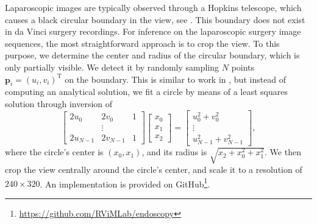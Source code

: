 Laparoscopic images are typically observed through a Hopkins telescope, which causes a black circular boundary in the view, see . This boundary does not exist in da Vinci surgery recordings. For inference on the laparoscopic surgery image sequences, the most straightforward approach is to crop the view. To this purpose, we determine the center and radius of the circular boundary, which is only partially visible. We detect it by randomly sampling $N$ points $\mathbf{p}_i = (u_i,v_i)^\text{T}$ on the boundary. This is similar to work in \cite{munzer2013detection}, but instead of computing an analytical solution, we fit a circle by means of a least squares solution through inversion of
\begin{equation}
    \begin{bmatrix}
        2u_0     & 2v_0     & 1 \\
                 & \vdots   & \\
        2u_{N-1} & 2v_{N-1} & 1
    \end{bmatrix}
    \begin{bmatrix}
        x_0 \\ x_1 \\ x_2
    \end{bmatrix} = 
    \begin{bmatrix}
        u_0^2 + v_0^2 \\
        \vdots        \\
        u_{N-1}^2 + v_{N-1}^2
    \end{bmatrix},
\end{equation}
where the circle's center is $(x_0, x_1)$, and its radius is $\sqrt{x_2 + x^2_0 + x^2_1}$. We then crop the view centrally around the circle's center, and scale it to a resolution of $240\times320$. An implementation is provided on GitHub\footnote[2]{\url{https://github.com/RViMLab/endoscopy}}.

